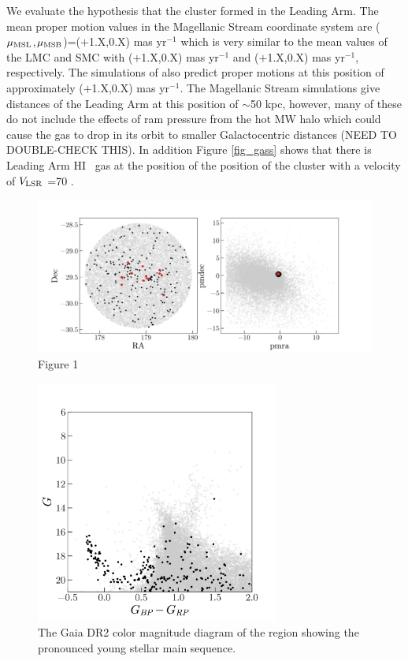 \documentclass[modern]{aastex62}
\newcommand{\vlsr}{$V_{\rm LSR}~$}
\newcommand{\hi}{H{\footnotesize I} }
\begin{document}
We evaluate the hypothesis that the cluster formed in the Leading Arm.  The mean proper motion values in the Magellanic Stream coordinate system \citep{Nidever:2008} are ($\mu_{\rm MSL}$,$\mu_{\rm MSB}$)=($+$1.X,0.X) mas yr$^{-1}$ which is very similar to the mean values of the LMC and SMC with ($+$1.X,0.X) mas yr$^{-1}$ and ($+$1.X,0.X) mas yr$^{-1}$, respectively.  The simulations of \citet{Besla:2012} also predict proper motions at this position of approximately ($+$1.X,0.X) mas yr$^{-1}$.  The Magellanic Stream simulations give distances of the Leading Arm at this position of $\sim$50 kpc, however, many of these do not include the effects of ram pressure from the hot MW halo which could cause the gas to drop in its orbit to smaller Galactocentric distances (NEED TO DOUBLE-CHECK THIS).  In addition Figure \ref{fig_gass} shows that there is Leading Arm \hi~gas at the position of the position of the cluster with a velocity of \vlsr=70 \kmse.



\begin{figure}
\centering
\includegraphics[width=12cm]{sky_pm.png}
\caption{Figure 1}
\label{fig_skypm}
\end{figure}

\begin{figure}
\centering
\includegraphics[width=8cm]{cmd.png}
\caption{The Gaia DR2 color magnitude diagram of the region showing the pronounced
young stellar main sequence.}
\label{fig_cmd}
\end{figure}
\end{document}
